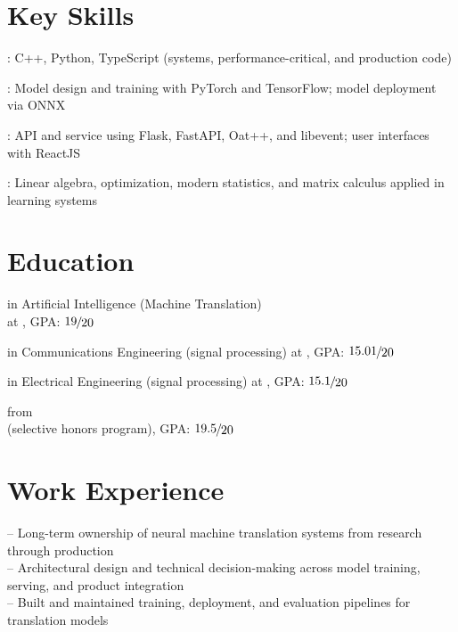 \documentclass[letterpaper, hidelinks, 11pt]{article}
\newcommand{\tfrac}[2]{%
  \ensuremath{%
    \raisebox{0.15ex}{$#1$}%
    \kern-0.075em/\kern-0.075em%
    \raisebox{-0.15ex}{$#2$}%
  }%
}
\newcommand{\exprDetail}[1]{\hspace{2em} -- #1\\}
\begin{document}
\section{Key Skills}
\begin{resume_list}
  \item {}: C++, Python, TypeScript (systems, performance-critical, and production code)
  \item {}: Model design and training with PyTorch and TensorFlow; model deployment via ONNX
  \item {}: API and service using Flask, FastAPI, Oat++, and libevent; user interfaces with ReactJS
  \item {}: Linear algebra, optimization, modern statistics, and matrix calculus applied in learning systems
\end{resume_list}
\section{Education}
\begin{resume_list}
  \item {} in Artificial Intelligence (Machine Translation)\\
  at , GPA: $\tfrac{19}{20}$
  \item {} in Communications Engineering (signal processing) at , GPA: $\tfrac{15.01}{20}$
  \item {} in Electrical Engineering (signal processing) at , GPA: $\tfrac{15.1}{20}$
  \item {} from \\
  (selective honors program), GPA: $\tfrac{19.5}{20}$
\end{resume_list}
\section{Work Experience}
\exprDetail{Long-term ownership of neural machine translation systems from research through production}
\exprDetail{Architectural design and technical decision-making across model training, serving, and product integration}
\exprDetail{Built and maintained training, deployment, and evaluation pipelines for translation models}
\end{document}
